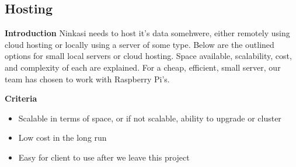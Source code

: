 \documentclass[draftclsnofoot,onecolumn,letterpaper,10pt]{IEEEtran}
\begin{document}
	\subsection{Hosting}

			\textbf{Introduction}
			Ninkasi needs to host it's data somehwere, either remotely using cloud hosting or locally using a server of some type.
			Below are the outlined options for small local servers or cloud hosting.
			Space available, scalability, cost, and complexity of each are explained.
			For a cheap, efficient, small server, our team has chosen to work with Raspberry Pi's.

			\textbf{Criteria}
			\begin{itemize}
				\item Scalable in terms of space, or if not scalable, ability to upgrade or cluster
				\item Low cost in the long run
				\item Easy for client to use after we leave this project
			\end{itemize}
\end{document}
